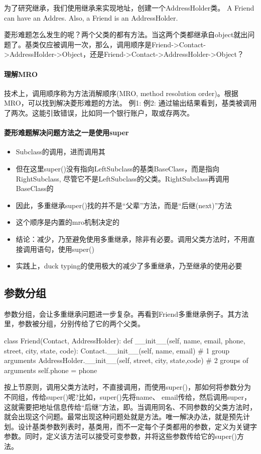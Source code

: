 为了研究继承，我们使用继承来实现地址，创建一个AddressHolder类。
A Friend can have an Addres. Also, a Friend is an AddressHolder.

菱形难题怎么发生的呢？两个父类的都有方法。当这两个类都继承自object就出问题了。基类仅应被调用一次，那么，调用顺序是Friend->Contact->AddressHolder->Object，还是Friend->Contact->AddressHolder->Object？
\paragraph{理解MRO}
技术上，调用顺序称为方法消解顺序(MRO, method resolution order)。根据MRO，可以找到解决菱形难题的方法。
例1:
例2:
通过输出结果看到，基类被调用了两次。这能引致错误，比如同一个银行账户，取或存两次。
\paragraph{菱形难题解决问题方法之一是使用super}
\begin{itemize}
\item Subclass的调用，进而调用其
\item 但在这里super()没有指向LeftSubclass的基类BaseClass，而是指向RightSubclass, 尽管它不是LeftSubclass的父类。RightSubclass再调用BaseClass的
\item 因此，多重继承super()找的并不是“父辈”方法，而是“后继(next)”方法
\item 这个顺序是内置的mro机制决定的
\item 结论：减少，乃至避免使用多重继承，除非有必要。调用父类方法时，不用直接调用语句，使用super()
\item 实践上，duck typing的使用极大的减少了多重继承，乃至继承的使用必要
\end{itemize}
\subsection{参数分组}
参数分组，会让多重继承问题进一步复杂。再看到Friend多重继承例子。其方法里，参数被分组，分别传给了它的两个父类。
\begin{python}
class Friend(Contact, AddressHolder):
    def __init__(self,
                name,
                email,
                phone,
                street,
                city,
                state,
                code):
        Contact.__init__(self, name, email)  # 1 group arguments
        AddressHolder.__init__(self, street, city, state,code)  # 2 groups of arguments
        self.phone = phone
\end{python}
按上节原则，调用父类方法时，不直接调用，而使用super()，那如何将参数分为不同组，传给super()呢?比如，super()先将name、 email传给，然后调用super，这就需要把地址信息传给“后继”方法，即。当调用同名、不同参数的父类方法时，就会出现这个问题。最常出现这种问题处就是方法。唯一解决办法，就是预先计划。设计基类参数列表时，基类用，而不一定每个子类都用的参数，定义为关键字参数。同时，定义该方法可以接受可变参数，并将这些参数传给它的super()方法。
  
